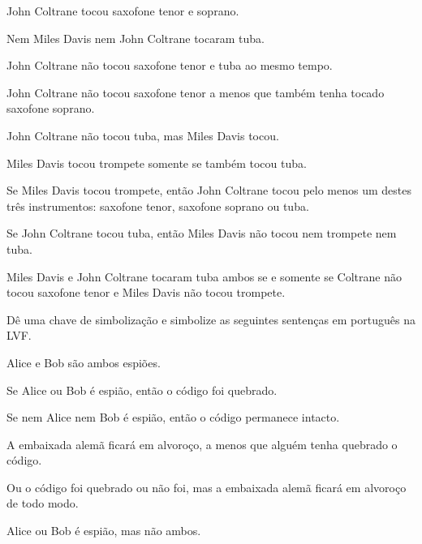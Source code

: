 \begin{compactlist}
\item John Coltrane tocou saxofone tenor e soprano. %
\item Nem Miles Davis nem John Coltrane tocaram tuba. %
\item John Coltrane não tocou saxofone tenor e tuba ao mesmo tempo. %
\item John Coltrane não tocou saxofone tenor a menos que também tenha tocado saxofone soprano. %
\item John Coltrane não tocou tuba, mas Miles Davis tocou. %
\item Miles Davis tocou trompete somente se também tocou tuba. %
\item Se Miles Davis tocou trompete, então John Coltrane tocou pelo menos um destes três instrumentos: saxofone tenor, saxofone soprano ou tuba. %
\item Se John Coltrane tocou tuba, então Miles Davis não tocou nem trompete nem tuba. %
\item Miles Davis e John Coltrane tocaram tuba ambos se e somente se Coltrane não tocou saxofone tenor e Miles Davis não tocou trompete. %
\end{compactlist}

\solutions
\problempart
\label{pr.spies}
Dê uma chave de simbolização e simbolize as seguintes sentenças em português na LVF.
\begin{compactlist}
\item Alice e Bob são ambos espiões.
\item Se Alice ou Bob é espião, então o código foi quebrado.
\item Se nem Alice nem Bob é espião, então o código permanece intacto.
\item A embaixada alemã ficará em alvoroço, a menos que alguém tenha quebrado o código.
\item Ou o código foi quebrado ou não foi, mas a embaixada alemã ficará em alvoroço de todo modo.
\item Alice ou Bob é espião, mas não ambos.
\end{compactlist}

